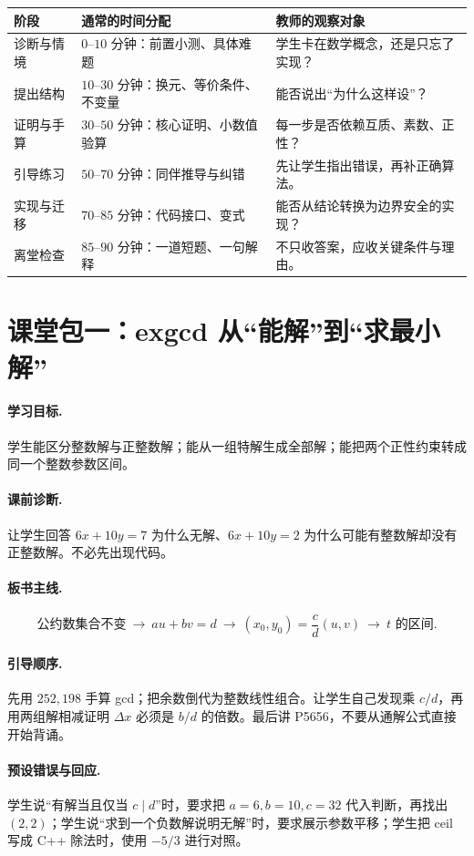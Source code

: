 \documentclass[UTF8,a4paper,11pt,twoside,openright,fontset=fandol]{ctexbook}
\theoremstyle{definition}
\begin{document}
\begin{longtable}{p{}p{}p{}}
\toprule
阶段 & 通常的时间分配 & 教师的观察对象\\\midrule
诊断与情境 & $0$--$10$ 分钟：前置小测、具体难题 & 学生卡在数学概念，还是只忘了实现？\\
提出结构 & $10$--$30$ 分钟：换元、等价条件、不变量 & 能否说出“为什么这样设”？\\
证明与手算 & $30$--$50$ 分钟：核心证明、小数值验算 & 每一步是否依赖互质、素数、正性？\\
引导练习 & $50$--$70$ 分钟：同伴推导与纠错 & 先让学生指出错误，再补正确算法。\\
实现与迁移 & $70$--$85$ 分钟：代码接口、变式 & 能否从结论转换为边界安全的实现？\\
离堂检查 & $85$--$90$ 分钟：一道短题、一句解释 & 不只收答案，应收关键条件与理由。\\
\bottomrule
\end{longtable}

\section{课堂包一：exgcd 从“能解”到“求最小解”}
\paragraph{学习目标.} 学生能区分整数解与正整数解；能从一组特解生成全部解；能把两个正性约束转成同一个整数参数区间。
\paragraph{课前诊断.} 让学生回答 $6x+10y=7$ 为什么无解、$6x+10y=2$ 为什么可能有整数解却没有正整数解。不必先出现代码。
\paragraph{板书主线.}
\[
\text{公约数集合不变}\ \longrightarrow\ au+bv=d
\ \longrightarrow\ (x_0,y_0)=\frac cd(u,v)
\ \longrightarrow\ t\text{ 的区间}.
\]
\paragraph{引导顺序.}
先用 $252,198$ 手算 gcd；把余数倒代为整数线性组合。让学生自己发现乘 $c/d$，再用两组解相减证明 $\Delta x$ 必须是 $b/d$ 的倍数。最后讲 P5656，不要从通解公式直接开始背诵。
\paragraph{预设错误与回应.}
学生说“有解当且仅当 $c\mid d$”时，要求把 $a=6,b=10,c=32$ 代入判断，再找出 $(2,2)$；学生说“求到一个负数解说明无解”时，要求展示参数平移；学生把 ceil 写成 C++ 除法时，使用 $-5/3$ 进行对照。
\end{document}
